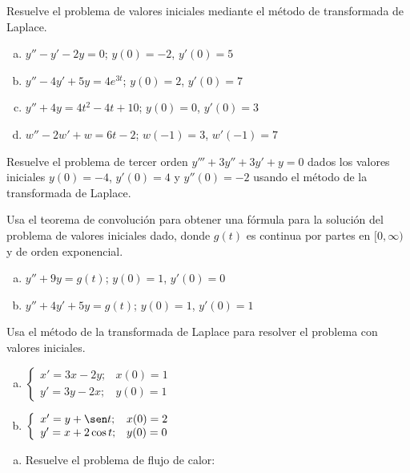\documentclass[12pt]{exam}
\begin{document}
    
    \begin{questions}
     \question
     Resuelve el problema de valores iniciales mediante el método de transformada de Laplace.
     \begin{enumerate}[a)]
         \item $y''-y'-2y=0$; $y(0)=-2$, $y'(0)=5$
         \item $y''-4y'+5y=4e^{3t}$; $y(0)=2$, $y'(0)=7$
         \item $y''+4y=4t^2-4t+10$; $y(0)=0$, $y'(0)=3$
         \item $w''-2w'+w=6t-2$; $w(-1)=3$, $w'(-1)=7$
     \end{enumerate}


     \question%
     Resuelve el problema de tercer orden $y'''+3y''+3y'+y=0$ dados los valores iniciales $y(0)=-4$, $y'(0)=4$ y $y''(0)=-2$ usando el método de la transformada de Laplace.

     
     \question%
     Usa el teorema de convolución para obtener una fórmula para la solución del problema de valores iniciales dado, donde $g(t)$ es continua por partes en $[0,\infty)$ y de orden exponencial.
     \begin{enumerate}[a)]
         \item $y''+9y=g(t)$; $y(0)=1$, $y'(0)=0$
         \item $y''+4y'+5y=g(t)$; $y(0)=1$, $y'(0)=1$
     \end{enumerate}


     \question%
     Usa el método de la transformada de Laplace para resolver el problema con valores iniciales.
     \begin{enumerate}[a)]
         \item $\left\lbrace\begin{array}{ll}
              x'=3x-2y;&x(0)=1  \\
              y'=3y-2x;&y(0)=1 
         \end{array}\right.$
         \item $\left\lbrace\begin{array}{ll}
              x'=y+\sen t;&x(0)=2  \\
              y'=x+2\cos t;&y(0)=0 
         \end{array}\right.$
     \end{enumerate}
  \vskip20pt
  
     \question%
     \begin{enumerate}[a)]
         \item Resuelve el problema de flujo de calor:
         

\end{enumerate}
\end{questions}
\end{document}
